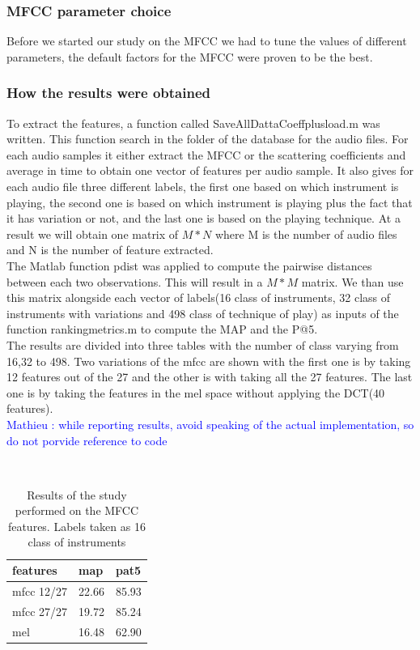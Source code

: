 \documentclass[hidelinks,12pt]{report}
\newcommand{\ml}[1]{\textcolor{blue}{ Mathieu : #1}}
\begin{document}
\subsubsection{MFCC parameter choice}
Before we started our study on the MFCC we had to tune the values of different parameters, the default factors for the MFCC were proven to be the best.
\subsubsection{How the results were obtained}
To extract the features, a function called SaveAllDattaCoeffplusload.m was written. This function search in the folder of the database for the audio files. For each audio samples it either extract the MFCC or the scattering coefficients and average in time to obtain one vector of features per audio sample. It also gives for each audio file three different labels, the first one based on which instrument is playing, the second one is based on which instrument is playing plus the fact that it has variation or not, and the last one is based on the playing technique. At a result we will obtain one matrix of $M*N$ where M is the number of audio files and N is the number of feature extracted.\\
The Matlab function pdist was applied to compute the pairwise distances between each two observations. This will result in a $M*M$ matrix. We than use this matrix alongside each vector of labels(16 class of instruments, 32 class of instruments with variations and 498 class of technique of play) as inputs of the function rankingmetrics.m to compute the MAP and the P@5.\\
The results are divided into three tables with the number of class varying from 16,32 to 498. Two variations of the mfcc are shown with the first one is by taking 12 features out of the 27 and the other is with taking all the 27 features. The last one is by taking the features in the mel space without applying the DCT(40 features).\\

\ml{while reporting results, avoid speaking of the actual implementation, so do not porvide reference to code}

\begin{table} [H]
\begin{center} 
\ 
 \setlength{\tabcolsep}{.16667em} 
\begin{tabular}{ | l | l | l | }
features  & map & pat5  \\ 
\hline 
mfcc 12/27  & 22.66 & 85.93  \\ 

mfcc 27/27  & 19.72 & 85.24  \\ 

mel &  16.48 & 62.90 \\ 

\end{tabular} 
\end{center} 
\caption{Results of the study performed on the MFCC features. Labels taken as 16 class of instruments} 
\label{you} 
\end{table} 
\end{document}
